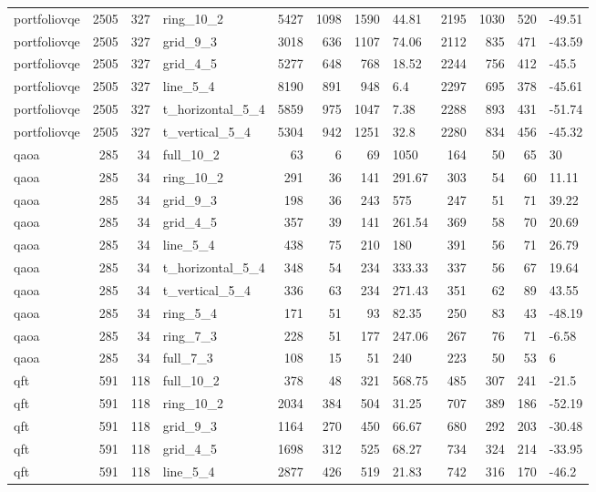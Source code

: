 \begin{longtable}{lrrlrrrlrrrl}
portfoliovqe & 2505 & 327 & ring\_10\_2 & 5427 & 1098 & 1590 & 44.81 & 2195 & 1030 & 520 & -49.51 \\
portfoliovqe & 2505 & 327 & grid\_9\_3 & 3018 & 636 & 1107 & 74.06 & 2112 & 835 & 471 & -43.59 \\
portfoliovqe & 2505 & 327 & grid\_4\_5 & 5277 & 648 & 768 & 18.52 & 2244 & 756 & 412 & -45.5 \\
portfoliovqe & 2505 & 327 & line\_5\_4 & 8190 & 891 & 948 & 6.4 & 2297 & 695 & 378 & -45.61 \\
portfoliovqe & 2505 & 327 & t\_horizontal\_5\_4 & 5859 & 975 & 1047 & 7.38 & 2288 & 893 & 431 & -51.74 \\
portfoliovqe & 2505 & 327 & t\_vertical\_5\_4 & 5304 & 942 & 1251 & 32.8 & 2280 & 834 & 456 & -45.32 \\
qaoa & 285 & 34 & full\_10\_2 & 63 & 6 & 69 & 1050 & 164 & 50 & 65 & 30 \\
qaoa & 285 & 34 & ring\_10\_2 & 291 & 36 & 141 & 291.67 & 303 & 54 & 60 & 11.11 \\
qaoa & 285 & 34 & grid\_9\_3 & 198 & 36 & 243 & 575 & 247 & 51 & 71 & 39.22 \\
qaoa & 285 & 34 & grid\_4\_5 & 357 & 39 & 141 & 261.54 & 369 & 58 & 70 & 20.69 \\
qaoa & 285 & 34 & line\_5\_4 & 438 & 75 & 210 & 180 & 391 & 56 & 71 & 26.79 \\
qaoa & 285 & 34 & t\_horizontal\_5\_4 & 348 & 54 & 234 & 333.33 & 337 & 56 & 67 & 19.64 \\
qaoa & 285 & 34 & t\_vertical\_5\_4 & 336 & 63 & 234 & 271.43 & 351 & 62 & 89 & 43.55 \\
qaoa & 285 & 34 & ring\_5\_4 & 171 & 51 & 93 & 82.35 & 250 & 83 & 43 & -48.19 \\
qaoa & 285 & 34 & ring\_7\_3 & 228 & 51 & 177 & 247.06 & 267 & 76 & 71 & -6.58 \\
qaoa & 285 & 34 & full\_7\_3 & 108 & 15 & 51 & 240 & 223 & 50 & 53 & 6 \\
qft & 591 & 118 & full\_10\_2 & 378 & 48 & 321 & 568.75 & 485 & 307 & 241 & -21.5 \\
qft & 591 & 118 & ring\_10\_2 & 2034 & 384 & 504 & 31.25 & 707 & 389 & 186 & -52.19 \\
qft & 591 & 118 & grid\_9\_3 & 1164 & 270 & 450 & 66.67 & 680 & 292 & 203 & -30.48 \\
qft & 591 & 118 & grid\_4\_5 & 1698 & 312 & 525 & 68.27 & 734 & 324 & 214 & -33.95 \\
qft & 591 & 118 & line\_5\_4 & 2877 & 426 & 519 & 21.83 & 742 & 316 & 170 & -46.2 \\

\end{longtable}
